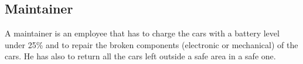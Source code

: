 \subsection{Maintainer}
A maintainer is an employee that has to charge the cars with a battery level under 25\% and to repair the broken components (electronic or mechanical) of the cars. He has also to return all the cars left outside a safe area in a safe one.